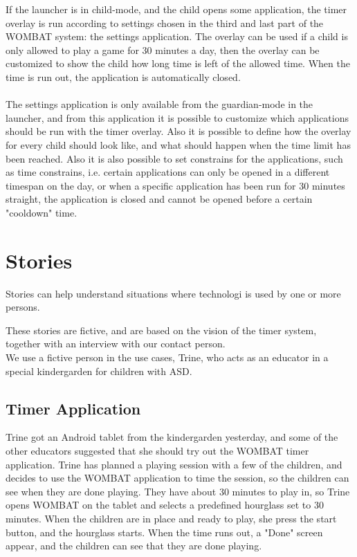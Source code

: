 	If the launcher is in child-mode, and the child opens some application, the timer overlay is run according to settings chosen in the third and last part of the WOMBAT system: the settings application. The overlay can be used if a child is only allowed to play a game for 30 minutes a day, then the overlay can be customized to show the child how long time is left of the allowed time. When the time is run out, the application is automatically closed.\\ \\
	The settings application is only available from the guardian-mode in the launcher, and from this application it is possible to customize which applications should be run with the timer overlay. Also it is possible to define how the overlay for every child should look like, and what should happen when the time limit has been reached. Also it is also possible to set constrains for the applications, such as time constrains, i.e. certain applications can only be opened in a different timespan on the day, or when a specific application has been run for 30 minutes straight, the application is closed and cannot be opened before a certain "cooldown" time.

\section{Stories}
Stories can help understand situations where technologi is used by one or more persons.

These stories are fictive, and are based on the vision of the timer system, together with an interview with our contact person.\\
We use a fictive person in the use cases, Trine, who acts as an educator in a special kindergarden for children with ASD.

	\subsection*{Timer Application}
	Trine got an Android tablet from the kindergarden yesterday, and some of the other educators suggested that she should try out the WOMBAT timer application. Trine has planned a playing session with a few of the children, and decides to use the WOMBAT application to time the session, so the children can see when they are done playing. They have about 30 minutes to play in, so Trine opens WOMBAT on the tablet and selects a predefined hourglass set to 30 minutes. When the children are in place and ready to play, she press the start button, and the hourglass starts. When the time runs out, a "Done" screen appear, and the children can see that they are done playing.

